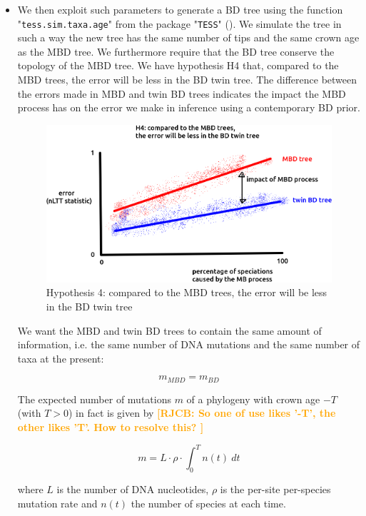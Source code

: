 \documentclass{article}
\newcommand*\richel[1]{\textcolor{orange}{\textbf{[RJCB: #1]}}}
\begin{document}
\begin{itemize}
\item We then exploit such parameters to generate a BD tree 
using the function "\texttt{tess.sim.taxa.age}" 
from the package "\texttt{TESS}" (\cite{Hoehna2013}). 
We simulate the tree in such a way the new tree 
has the same number of tips and the same crown age as the MBD tree. 
We furthermore require that the BD tree conserve the topology of the MBD tree.
We have hypothesis H4 that, compared to the MBD trees, 
the error will be less in the BD twin tree.
The difference between the errors made in MBD and twin BD trees indicates
the impact the MBD process has on the error we make in inference using a
contemporary BD prior.

\begin{figure}[!htbp]
  \includegraphics[width=\textwidth]{fig_h_4.png}
  \caption{
    Hypothesis 4: compared to the MBD trees, 
    the error will be less in the BD twin tree
  }
  \label{fig:h_4}
\end{figure}


We want the MBD and twin BD trees to contain the same amount of information, 
i.e. the same number of DNA mutations and the same number of taxa at the present:

\begin{equation}
m_{MBD} = m_{BD} \label{m equivalence}
\end{equation} 

The expected number of mutations $m$ of a phylogeny 
with crown age $-T$ (with $T>0$) in fact is given by
\richel{
  So one of use likes '-T', the other likes 'T'. How to resolve this?
}

\begin{equation}
m = L \cdot \rho \cdot \int_{0}^{T} n(t)\ dt \label{m calculation}
\end{equation}

where $L$ is the number of DNA nucleotides, 
$\rho$ is the per-site per-species mutation rate and
$n(t)$ the number of species at each time.


\end{itemize}
\end{document}
